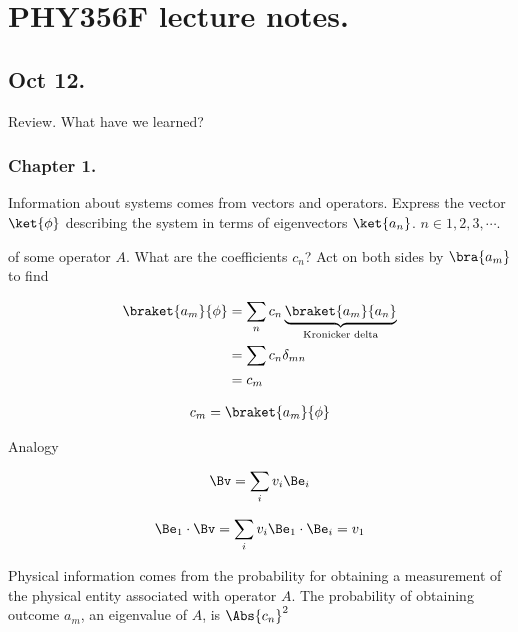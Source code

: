 
%

\chapter{PHY356F lecture notes.}
\label{chap:PHY356F}
{}

\beginArtWithToc

\section{Oct 12.}

Review.  What have we learned?

\subsection{Chapter 1.}
Information about systems comes from vectors and operators.  Express the vector $\ket{\phi}$ describing the system in terms of eigenvectors $\ket{a_n}$.  $n \in 1,2,3,\cdots$.

of some operator $A$.  What are the coefficients $c_n$?  Act on both sides by $\bra{a_m}$ to find

\begin{align*}
\braket{a_m}{\phi}
&= \sum_n c_n \underbrace{\braket{a_m}{a_n}}_{\text{Kronicker delta}}  \\
&= \sum c_n \delta_{mn} \\
&= c_m
\end{align*}

\begin{align*}
c_m = \braket{a_m}{\phi}
\end{align*}

Analogy

\begin{align*}
\Bv = \sum_i v_i \Be_i
\end{align*}

\begin{align*}
\Be_1 \cdot \Bv = \sum_i v_i \Be_1 \cdot \Be_i = v_1
\end{align*}

Physical information comes from the probability for obtaining a measurement of the physical entity associated with operator $A$.  The probability of obtaining outcome $a_m$, an eigenvalue of $A$, is $\Abs{c_n}^2$

